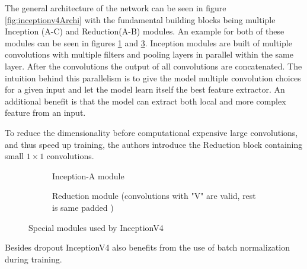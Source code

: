 The general architecture of the network can be seen in figure \ref{fig:inceptionv4Archi} with the fundamental building blocks being multiple Inception (A-C) and Reduction(A-B) modules. 
An example for both of these modules can be seen in figures \ref{fig:InceptionA} and \ref{fig:InceptionReduction}.
Inception modules are built of multiple convolutions with multiple filters and pooling layers in parallel within the same layer.
After the convolutions the output of all convolutions are concatenated.
The intuition behind this parallelism is to give the model multiple convolution choices for a given input and let the model learn itself the best feature extractor. An additional benefit is that the model can extract both local and more complex feature from an input.

To reduce the dimensionality before computational expensive large convolutions, and thus speed up training, the authors introduce the Reduction block containing small $1\times1$ convolutions.   %




\begin{figure}[!htb]
\centering
\begin{subfigure}[b]{.95\textwidth}
\centering
   \resizebox{.8\linewidth}{!}{}
   \caption{Inception-A module}
   \label{fig:InceptionA} 
\end{subfigure}

\vspace{1em}
\begin{subfigure}[b]{.95\textwidth}
\centering
   \resizebox{.6\linewidth}{!}{}
   \caption{Reduction module (convolutions with "V" are valid, rest is same padded )}
   \label{fig:InceptionReduction}
\end{subfigure}

\caption{Special modules used by InceptionV4}

\end{figure}




Besides dropout InceptionV4 also benefits from the use of batch normalization during training.

